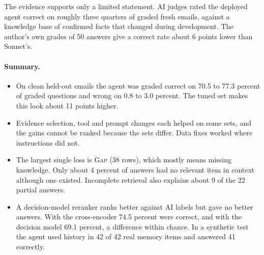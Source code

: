 The evidence supports only a limited statement. AI judges rated the deployed agent correct on roughly three quarters of graded fresh emails, against a knowledge base of confirmed facts that changed during development. The author's own grades of 50 answers give a correct rate about 6 points lower than Sonnet's.

\paragraph{Summary.}
\begin{itemize}
  \item On clean held-out emails the agent was graded correct on 70.5 to 77.3 percent of graded questions and wrong on 0.8 to 3.0 percent. The tuned set makes this look about 11 points higher.
  \item Evidence selection, tool and prompt changes each helped on some sets, and the gains cannot be ranked because the sets differ. Data fixes worked where instructions did not.
  \item The largest single loss is \textsc{Gap} (38 rows), which mostly means missing knowledge. Only about 4 percent of answers had no relevant item in context although one existed. Incomplete retrieval also explains about 9 of the 22 partial answers.
  \item A decision-model reranker ranks better against AI labels but gave no better answers. With the cross-encoder 74.5 percent were correct, and with the decision model 69.1 percent, a difference within chance. In a synthetic test the agent used history in 42 of 42 real memory items and answered 41 correctly.
\end{itemize}
